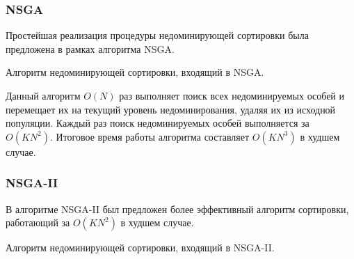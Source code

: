 \subsubsection{NSGA}
Простейшая реализация процедуры недоминирующей сортировки была предложена в рамках алгоритма NSGA.
\cite{nsga1}
\begin{algorithm}[H]
\begin{algorithmic}[1]
				\EndIf
			\EndFor
			\EndIf
		\EndFor
	\EndWhile
\EndProcedure
\end{algorithmic}
\caption{Алгоритм недоминирующей сортировки, входящий в NSGA.}
\label{NDS_NSGA}
\end{algorithm}
Данный алгоритм $O(N)$ раз выполняет поиск всех недоминируемых особей и перемещает 
их на текущий уровень недоминирования, удаляя их из исходной популяции.
Каждый раз поиск недоминируемых особей выполняется за $O(KN^2)$. Итоговое время работы алгоритма
составляет $O(KN^3)$ в худшем случае. \cite{deb_nsga2}

\subsubsection{NSGA-II}
В алгоритме NSGA-II был предложен более эффективный алгоритм сортировки, работающий за $O(KN^2)$
в худшем случае.\cite{deb_nsga2}
\begin{algorithm}[H]
\begin{algorithmic}[1]
			\EndIf
		\EndFor
		\EndIf
	\EndFor
				\EndIf
			\EndFor
		\EndFor
	\EndWhile
\EndProcedure
\end{algorithmic}
\caption{Алгоритм недоминирующей сортировки, входящий в NSGA-II.}
\label{NDS_NSGA2}
\end{algorithm}

